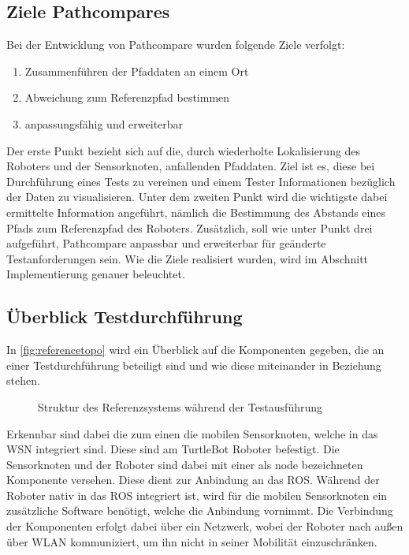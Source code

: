 \subsection{Ziele Pathcompares}

Bei der Entwicklung von Pathcompare wurden folgende Ziele verfolgt:

\begin{enumerate}
  \item Zusammenführen der Pfaddaten an einem Ort
  \item Abweichung zum Referenzpfad bestimmen
  \item anpassungsfähig und erweiterbar
\end{enumerate}

Der erste Punkt bezieht sich auf die, durch wiederholte Lokalisierung des
Roboters und der Sensorknoten, anfallenden Pfaddaten. Ziel ist es, diese bei
Durchführung eines Tests zu vereinen und einem Tester Informationen bezüglich
der Daten zu visualisieren. Unter dem zweiten Punkt wird die wichtigste dabei
ermittelte Information angeführt, nämlich die Bestimmung des Abstands eines
Pfads zum Referenzpfad des Roboters. Zusätzlich, soll wie unter Punkt drei
aufgeführt, Pathcompare anpassbar und erweiterbar für geänderte
Testanforderungen sein. Wie die Ziele realisiert wurden, wird im Abschnitt
Implementierung genauer beleuchtet.

\subsection{Überblick Testdurchführung}

In \autoref{fig:referencetopo} wird ein Überblick auf die Komponenten gegeben,
die an einer Testdurchführung beteiligt sind und wie diese miteinander in
Beziehung stehen.

\begin{figure}[t]
  \begin{center}
  \end{center}
  \caption{Struktur des Referenzsystems während der Testausführung}
  \label{fig:referencetopo}
\end{figure}

Erkennbar sind dabei die zum einen die mobilen Sensorknoten, welche in das \gls{WSN} integriert sind.
Diese sind am TurtleBot Roboter befestigt. Die Sensorknoten und der Roboter
sind dabei mit einer als node bezeichneten Komponente versehen. Diese dient zur
Anbindung an das ROS. Während der Roboter nativ in das ROS integriert ist, wird
für die mobilen Sensorknoten ein zusätzliche Software benötigt, welche die
Anbindung vornimmt. Die Verbindung der Komponenten erfolgt dabei über ein
Netzwerk, wobei der Roboter nach außen über WLAN kommuniziert, um ihn nicht in seiner
Mobilität einzuschränken.
